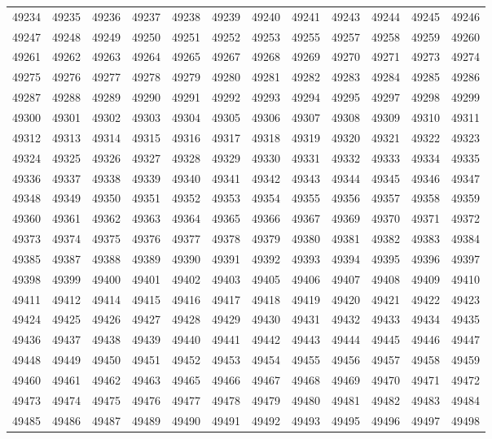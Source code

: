\begin{center}
\begin{longtable}{llllllllllll}
49234 &49235 &49236 &49237 &49238 &49239 &49240 &49241 &49243 &49244 &49245 &49246 \\
49247 &49248 &49249 &49250 &49251 &49252 &49253 &49255 &49257 &49258 &49259 &49260 \\
49261 &49262 &49263 &49264 &49265 &49267 &49268 &49269 &49270 &49271 &49273 &49274 \\
49275 &49276 &49277 &49278 &49279 &49280 &49281 &49282 &49283 &49284 &49285 &49286 \\
49287 &49288 &49289 &49290 &49291 &49292 &49293 &49294 &49295 &49297 &49298 &49299 \\
49300 &49301 &49302 &49303 &49304 &49305 &49306 &49307 &49308 &49309 &49310 &49311 \\
49312 &49313 &49314 &49315 &49316 &49317 &49318 &49319 &49320 &49321 &49322 &49323 \\
49324 &49325 &49326 &49327 &49328 &49329 &49330 &49331 &49332 &49333 &49334 &49335 \\
49336 &49337 &49338 &49339 &49340 &49341 &49342 &49343 &49344 &49345 &49346 &49347 \\
49348 &49349 &49350 &49351 &49352 &49353 &49354 &49355 &49356 &49357 &49358 &49359 \\
49360 &49361 &49362 &49363 &49364 &49365 &49366 &49367 &49369 &49370 &49371 &49372 \\
49373 &49374 &49375 &49376 &49377 &49378 &49379 &49380 &49381 &49382 &49383 &49384 \\
49385 &49387 &49388 &49389 &49390 &49391 &49392 &49393 &49394 &49395 &49396 &49397 \\
49398 &49399 &49400 &49401 &49402 &49403 &49405 &49406 &49407 &49408 &49409 &49410 \\
49411 &49412 &49414 &49415 &49416 &49417 &49418 &49419 &49420 &49421 &49422 &49423 \\
49424 &49425 &49426 &49427 &49428 &49429 &49430 &49431 &49432 &49433 &49434 &49435 \\
49436 &49437 &49438 &49439 &49440 &49441 &49442 &49443 &49444 &49445 &49446 &49447 \\
49448 &49449 &49450 &49451 &49452 &49453 &49454 &49455 &49456 &49457 &49458 &49459 \\
49460 &49461 &49462 &49463 &49465 &49466 &49467 &49468 &49469 &49470 &49471 &49472 \\
49473 &49474 &49475 &49476 &49477 &49478 &49479 &49480 &49481 &49482 &49483 &49484 \\
49485 &49486 &49487 &49489 &49490 &49491 &49492 &49493 &49495 &49496 &49497 &49498 \\

\end{longtable}
\end{center}
